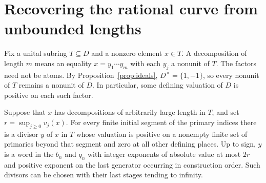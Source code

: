\section{Recovering the rational curve from unbounded lengths}
\label{sec:curve}

Fix a unital subring $T \subseteq D$ and a nonzero element $x \in T$.
A decomposition of length $m$ means an equality $x = y_1 \cdots y_m$ with each $y_j$ a nonunit of $T$.
The factors need not be atoms.
By Proposition~\ref{prop:ideals}, $D^{\times} = \{1, -1\}$, so every nonunit of $T$ remains a nonunit of $D$.
In particular, some defining valuation of $D$ is positive on each such factor.

\begin{lemma}
    \label{lem:extraction}
    Suppose that $x$ has decompositions of arbitrarily large length in $T$, and set $r = \sup_{j \ge 0} v_j(x)$.
    For every finite initial segment of the primary indices there is a divisor $y$ of $x$ in $T$ whose valuation is positive on a nonempty finite set of primaries beyond that segment and zero at all other defining places.
    Up to sign, $y$ is a word in the $b_n$ and $q_n$ with integer exponents of absolute value at most $2r$ and positive exponent on the last generator occurring in construction order.
    Such divisors can be chosen with their last stages tending to infinity.
\end{lemma}

